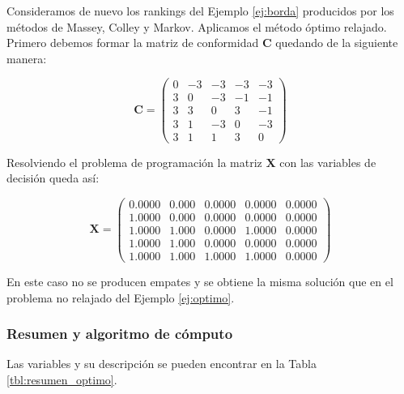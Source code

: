 \begin{ejemplo}
Consideramos de nuevo los rankings del Ejemplo \ref{ej:borda} producidos por los métodos de Massey, Colley y Markov. Aplicamos el método óptimo relajado. Primero debemos formar la matriz de conformidad $\mathbf{C}$ quedando de la siguiente manera:

\begin{equation*}
\mathbf{C} = \left(\begin{array}{rrrrr}
0 & -3 & -3 & -3 & -3 \\
3 &  0 & -3 & -1 & -1 \\
3 &  3 &  0 &  3 & -1 \\
3 &  1 & -3 &  0 & -3 \\
3 &  1 &  1	&  3 &	0
\end{array}\right)
\end{equation*}

Resolviendo el problema de programación la matriz $\mathbf{X}$ con las variables de decisión queda así:

\begin{equation*}
\mathbf{X} = \left(\begin{array}{rrrrr}
0.0000 & 0.000 & 0.0000 & 0.0000 & 0.0000 \\
1.0000 & 0.000 & 0.0000 & 0.0000 & 0.0000 \\
1.0000 & 1.000 & 0.0000 & 1.0000 & 0.0000 \\
1.0000 & 1.000 & 0.0000 & 0.0000 & 0.0000 \\
1.0000 & 1.000 & 1.0000 & 1.0000 & 0.0000
\end{array}\right)
\end{equation*}

En este caso no se producen empates y se obtiene la misma solución que en el problema no relajado del Ejemplo \ref{ej:optimo}.


\end{ejemplo}

\subsubsection*{Resumen y algoritmo de cómputo}

Las variables y su descripción se pueden encontrar en la Tabla \ref{tbl:resumen_optimo}.\\



